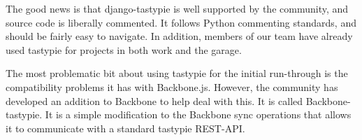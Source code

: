 The good news is that django-tastypie is well supported by the community, and source code is liberally commented. It follows Python commenting standards, and should be fairly easy to navigate. In addition, members of our team have already used tastypie for projects in both work and the garage. 

The most problematic bit about using tastypie for the initial run-through is the compatibility problems it has with Backbone.js. However, the community has developed an addition to Backbone to help deal with this. It is called Backbone-tastypie. It is a simple modification to the Backbone sync operations that allows it to communicate with a standard tastypie REST-API.
